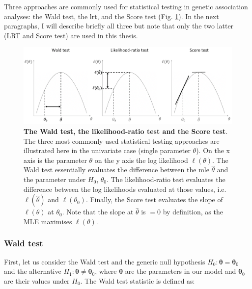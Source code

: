 
\vspace{5mm}

Three approaches are commonly used for statistical testing in genetic association analyses: the Wald test, the \gls{lrt}, and the Score test (Fig. \ref{fig:hypothesis_tests}).
In the next paragraphs, I will describe briefly all three but note that only the two latter (LRT and Score test) are used in this thesis.

\begin{figure}[h]
\centering
\includegraphics[width=15cm]{Chapter2/Fig/wald_lrt_score_tests.png}
\caption[Wald, LRT and Score test]{\textbf{The Wald test, the likelihood-ratio test and the Score test}.\\
The three most commonly used statistical testing approaches are illustrated here in the univariate case (single parameter $\theta$). 
On the x axis is the parameter $\theta$ on the y axis the log likelihood $\ell(\theta)$.
The Wald test essentially evaluates the difference between the \gls{mle} $\hat{\theta}$ and the parameter under $H_0$, $\theta_0$.
The likelihood-ratio test evaluates the difference between the log likelihoods evaluated at those values, i.e. $\ell(\hat{\theta})$ and $\ell(\theta_0)$.
Finally, the Score test evaluates the slope of $\ell(\theta)$ at $\theta_0$. Note that the slope at $\hat{\theta}$ is $=0$ by definition, as the MLE maximises $\ell(\theta)$.}
\label{fig:hypothesis_tests}
\end{figure}

\newpage

\subsubsection{Wald test}

First, let us consider the Wald test and the generic null hypothesis $H_0: \boldsymbol{\theta} = \boldsymbol{\theta}_0$ and the alternative $H_1: \boldsymbol{\theta} \neq \boldsymbol{\theta}_0$, where $\boldsymbol{\theta}$ are the parameters in our model and $\boldsymbol{\theta}_0$ are their values under $H_0$.
The Wald test statistic is defined as:

